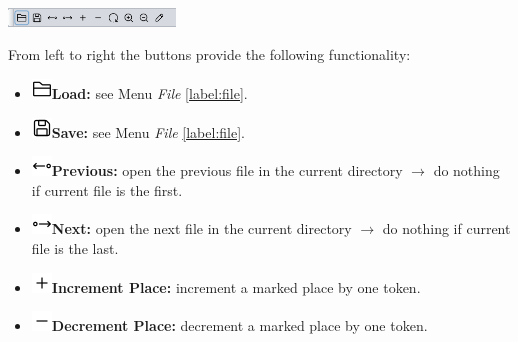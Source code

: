 \documentclass[10pt, a4paper]{article}
\begin{document}
\includegraphics[height=0.5cm]{Viewer_Petrinet_Toolbar.png}
\label{label:viewer}

From left to right the buttons provide the following functionality:

\begin{itemize}

\item\includegraphics[scale=0.4]{../src/resources/images/Toolbar/folder.png}\hspace{0.1cm}\textbf{Load:} see Menu \textit{File} \ref{label:file}.
\item\includegraphics[scale=0.4]{../src/resources/images/Toolbar/save.png}\hspace{0.1cm}\textbf{Save:} see Menu \textit{File} \ref{label:file}.
\item\includegraphics[scale=0.4]{../src/resources/images/Toolbar/left.png}\hspace{0.1cm}\textbf{Previous:} open the previous file in the current directory $\rightarrow$ do nothing if current file is the first.
\item\includegraphics[scale=0.4]{../src/resources/images/Toolbar/right.png}\hspace{0.1cm}\textbf{Next:} open the next file in the current directory $\rightarrow$ do nothing if current file is the last.
\item\includegraphics[scale=0.4]{../src/resources/images/Toolbar/plus.png}\hspace{0.1cm}\textbf{Increment Place:} increment a marked place by one token.
\item\includegraphics[scale=0.4]{../src/resources/images/Toolbar/minus.png}\hspace{0.1cm}\textbf{Decrement Place:} decrement a marked place by one token.

\end{itemize}
\end{document}
